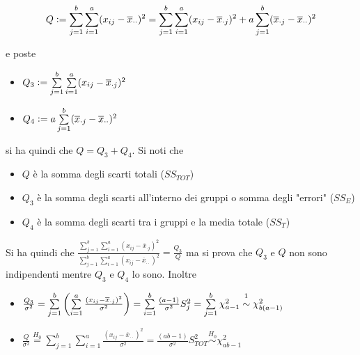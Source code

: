 \documentclass[hidelinks, 10pt]{report}
\begin{document}
\[ Q \vcentcolon= \sum\limits_{j = 1}^{b} \sum\limits_{i = 1}^{a} (x_{ij} - \overline{x}_{\cdot \cdot})^{2} = \sum\limits_{j = 1}^{b} \sum\limits_{i = 1}^{a} (x_{ij} - \overline{x}_{\cdot j})^{2} + a \sum\limits_{j = 1}^{b} (\overline{x}_{\cdot j} - \overline{x}_{\cdot \cdot})^{2} \]

e poste

\begin{itemize}
\item $ Q_{3} \vcentcolon= \sum\limits_{j = 1}^{b} \sum\limits_{i = 1}^{a} (x_{ij} - \overline{x}_{\cdot j})^{2} $
\item $ Q_{4} \vcentcolon= a \sum\limits_{j = 1}^{b} (\overline{x}_{\cdot j} - \overline{x}_{\cdot \cdot})^{2} $
\end{itemize}

si ha quindi che $ Q = Q_{3} + Q_{4} $. Si noti che
\begin{itemize}
\item $ Q $ \`e la somma degli scarti totali ($ SS_{TOT} $)
\item $ Q_{3} $ \`e la somma degli scarti all'interno dei gruppi o somma degli "errori" ($ SS_{E} $)
\item $ Q_{4} $ \`e la somma degli scarti tra i gruppi e la media totale ($ SS_{T} $)
\end{itemize}

Si ha quindi che $ \frac{\sum\limits_{j = 1}^{b} \sum\limits_{i = 1}^{a} (x_{ij} - \overline{x}_{\cdot j})^{2}}{\sum\limits_{j = 1}^{b} \sum\limits_{i = 1}^{a} (x_{ij} - \overline{x}_{\cdot \cdot})^{2}} = \frac{Q_{3}}{Q} $ ma si prova che $ Q_{3} $ e $ Q $ non sono indipendenti mentre $ Q_{3} $ e $ Q_{4} $ lo sono. Inoltre

\begin{itemize}
\item $ \frac{Q_{3}}{\sigma^{2}} = \sum\limits_{j = 1}^{b} \left( \sum\limits_{i = 1}^{a} \frac{(x_{ij} - \overline{x}_{\cdot j})^{2}}{\sigma^{2}} \right) = \sum\limits_{i = 1}^{b} \frac{(a - 1)}{\sigma^{2}} S_{j}^{2} = \sum\limits_{j = 1}^{b} \chi^{2}_{a  - 1} \stackrel{\footnotemark[1]}{\sim} \chi^{2}_{b(a - 1)} $
\item $ \frac{Q}{\sigma^{2}} \stackrel{H_{0}}{=} \sum\limits_{j = 1}^{b} \sum\limits_{i = 1}^{a} \frac{(x_{ij} - \overline{x}_{\cdot \cdot})^{2}}{\sigma^{2}} = \frac{(ab - 1)}{\sigma^{2}} S_{TOT}^{2} \stackrel{H_{0}}{\sim} \chi^{2}_{ab - 1} $
\end{itemize}
\end{document}
